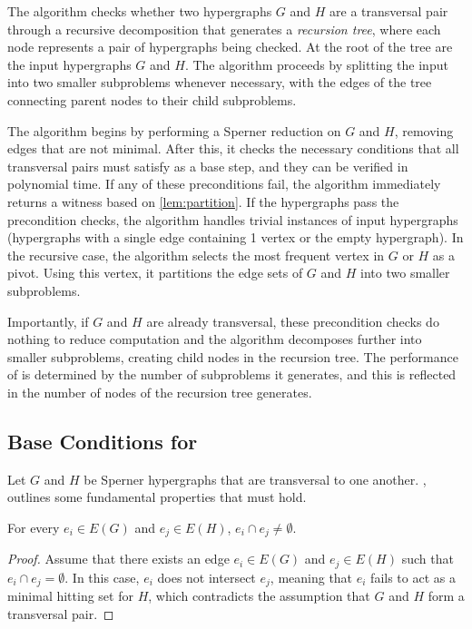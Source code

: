 The \FKA{} algorithm checks whether two hypergraphs $G$ and $H$ are a transversal pair through a recursive decomposition that generates a \emph{recursion tree}, where each node represents a pair of hypergraphs being checked. At the root of the tree are the input hypergraphs $G$ and $H$. The algorithm proceeds by splitting the input into two smaller subproblems whenever necessary, with the edges of the tree connecting parent nodes to their child subproblems.

The algorithm begins by performing a Sperner reduction on $G$ and $H$, removing edges that are not minimal. After this, it checks the necessary conditions that all transversal pairs must satisfy as a base step, and they can be verified in polynomial time. If any of these preconditions fail, the algorithm immediately returns a witness based on \ref{lem:partition}. If the hypergraphs pass the precondition checks, the algorithm handles trivial instances of input hypergraphs (hypergraphs with a single edge containing 1 vertex or the empty hypergraph). In the recursive case, the algorithm selects the most frequent vertex in $G$ or $H$ as a pivot. Using this vertex, it partitions the edge sets of $G$ and $H$ into two smaller subproblems.

Importantly, if $G$ and $H$ are already transversal, these precondition checks do nothing to reduce computation and the algorithm decomposes further into smaller subproblems, creating child nodes in the recursion tree. The performance of \FKA{} is determined by the number of subproblems it generates, and this is reflected in the number of nodes of the recursion tree \FKA{} generates.

\cite{FK96}

\subsection{Base Conditions for \FKA}

Let $G$ and $H$ be Sperner hypergraphs that are transversal to one another. \cite{DNU21}, \cite{FK96} outlines some fundamental properties that must hold.

\begin{proposition}\label{prop:intersect}
For every $e_i\in E(G)$ and $e_j\in E(H)$, $e_i\cap e_j\neq\emptyset$.
\end{proposition}

\begin{proof}
Assume that there exists an edge $e_i\in E(G)$ and $e_j\in E(H)$ such that $e_i\cap e_j=\emptyset$. In this case, $e_i$ does not intersect $e_j$, meaning that $e_i$ fails to act as a minimal hitting set for $H$, which contradicts the assumption that $G$ and $H$ form a transversal pair.
\end{proof}

